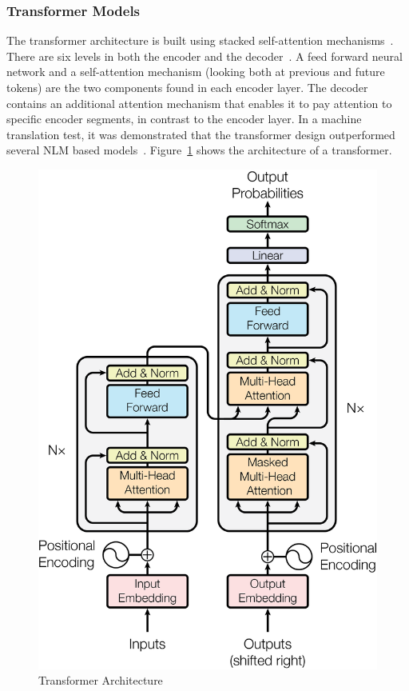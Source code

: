 

\subsubsection{Transformer Models}
The transformer architecture is built using stacked self-attention mechanisms~\cite{attention}. There are six levels in both the encoder and the decoder~\cite{attention}. 
A feed forward neural network and a self-attention mechanism (looking both at previous and future tokens) are the two components found in each encoder layer. The decoder contains an additional attention mechanism that enables it to pay attention to specific encoder segments, in contrast to the encoder layer. 
In a machine translation test, it was demonstrated that the transformer design outperformed several NLM based models~\cite{attention}. Figure~\ref{fig:transformer} shows the architecture of a transformer.

\begin{figure}[hbt!]
    \centering
    \includegraphics[width=.4\linewidth]{Figures/transformer.png}
    \caption{Transformer Architecture~\cite{attention}}
    \label{fig:transformer}
\end{figure}

